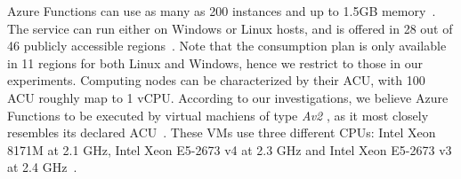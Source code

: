 Azure Functions can use as many as 200 instances and up to 1.5GB memory~\cite{AzureFunctionsPlans}. 
The service can run either on Windows or Linux hosts, and is offered in 28 out of 46 publicly accessible regions~\cite{AzureRegions}.
Note that the consumption plan is only available in 11 regions for both Linux and Windows, hence we restrict to those in our experiments.
Computing nodes can be characterized by their \gls{ACU}, with 100 ACU roughly map to 1 \gls{vCPU}.
According to our investigations, we believe Azure Functions to be executed by virtual machiens of type \textit{Av2} , as it most closely resembles its declared \gls{ACU}~\cite{AzureFunctionsVMs}. 
These \gls{VM}s use three different \gls{CPU}s: Intel Xeon 8171M at 2.1 \gls{GHz}, Intel Xeon E5-2673 v4 at 2.3 \gls{GHz} and Intel Xeon E5-2673 v3 at 2.4 \gls{GHz}~\cite{AzureFunctionsVMs}.

